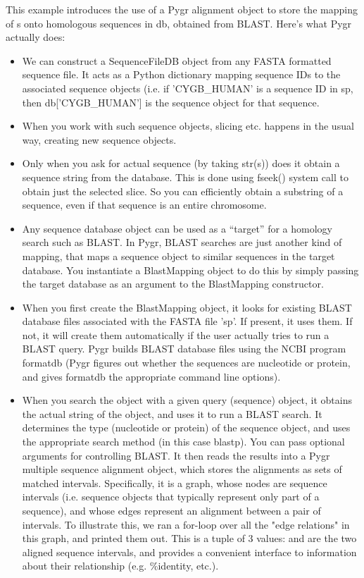 \documentclass{howto}
\begin{document}
This example introduces the use of a Pygr alignment object to store the mapping of s onto homologous sequences in db, obtained from BLAST.  Here's what Pygr actually does:

\begin{itemize}

\item
We can construct a SequenceFileDB object from any FASTA formatted sequence file.
It acts as a Python dictionary mapping sequence IDs to the associated sequence objects (i.e. if 'CYGB_HUMAN' is a sequence ID in sp, then db['CYGB_HUMAN'] is the sequence object for that sequence.  

\item 
When you work with such sequence objects, slicing etc. happens in the usual way, creating new sequence objects.

\item  
Only when you ask for actual sequence (by taking str(s)) does it obtain a sequence string from the database.  This is done using fseek() system call to obtain just the selected slice.  So you can efficiently obtain a substring of a sequence, even if that sequence is an entire chromosome.

\item
Any sequence database object can be used as a ``target'' for a homology
search such as BLAST.  In Pygr, BLAST searches are just another kind
of mapping, that maps a sequence object to similar sequences in the 
target database.  You instantiate a BlastMapping object to do this by
simply passing the target database as an argument to the BlastMapping
constructor.

\item
When you first create the BlastMapping object, it looks for existing BLAST database files associated with the FASTA file 'sp'.  If present, it uses them.  If not, it will create them automatically if the user actually tries to run a BLAST query.  Pygr builds BLAST database files using the NCBI program formatdb (Pygr figures out whether the sequences are nucleotide or protein, and gives formatdb the appropriate command line options).  

\item 
When you search the  object with a given query (sequence) object, it obtains the actual string of the object, and uses it to run a BLAST search.  It determines the type (nucleotide or protein) of the sequence object, and uses the appropriate search method (in this case blastp).  You can pass optional arguments for controlling BLAST.  It then reads the results into a Pygr multiple sequence alignment object, which stores the alignments as sets of matched intervals.  Specifically, it is a graph, whose nodes are sequence intervals (i.e. sequence objects that typically represent only part of a sequence), and whose edges represent an alignment between a pair of intervals.  To illustrate this, we ran a for-loop over all the "edge relations" in this graph, and printed them out.  This is a tuple of 3 values:  and  are the two aligned sequence intervals, and  provides a convenient interface to information about their relationship (e.g. \%identity, etc.).  


\end{itemize}
\end{document}
